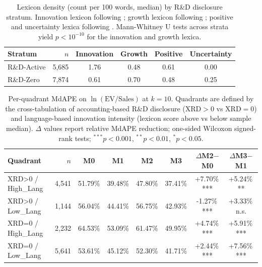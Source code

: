 \begin{table}[ht]
\centering
\caption{Lexicon density (count per 100 words, median) by R\&D disclosure stratum. Innovation lexicon following \citet{bellstam2021innovation}; growth lexicon following \citet{brown2011mda}; positive and uncertainty lexica following \citet{loughran2011liability}. Mann-Whitney U tests across strata yield $p < 10^{-10}$ for the innovation and growth lexica.}
\label{tab:phase_d1}
\small
\begin{tabular}{lr cccc}
\toprule
Stratum & $n$ & Innovation & Growth & Positive & Uncertainty \\
\midrule
  R\&D-Active   & 5,685 &  1.76 &  0.48 &  0.61 &  0.00 \\
  R\&D-Zero     & 7,874 &  0.61 &  0.70 &  0.48 &  0.25 \\
\bottomrule
\end{tabular}
\end{table}

\begin{table}[ht]
\centering
\caption{Per-quadrant MdAPE on $\ln(\textrm{EV}/\textrm{Sales})$ at $k=10$. Quadrants are defined by the cross-tabulation of accounting-based R\&D disclosure (XRD$>$0 vs XRD$=$0) and language-based innovation intensity (lexicon score above vs below sample median). $\Delta$ values report relative MdAPE reduction; one-sided Wilcoxon signed-rank tests; $^{***}p<0.001$, $^{**}p<0.01$, $^{*}p<0.05$.}
\label{tab:phase_d5}
\small
\begin{tabular}{lr cccc cc}
\toprule
Quadrant & $n$ & M0 & M1 & M2 & M3 & $\Delta$M2$-$M0 & $\Delta$M3$-$M1 \\
\midrule
  XRD>0 / High_Lang         & 4,541 & 51.79\% & 39.48\% & 47.80\% & 37.41\% & +7.70\%\,*** & +5.24\%\,** \\
  XRD>0 / Low_Lang          & 1,144 & 56.04\% & 44.41\% & 56.75\% & 42.93\% & -1.27\%\,*** & +3.33\%\,n.s. \\
  XRD=0 / High_Lang         & 2,232 & 64.53\% & 53.09\% & 61.47\% & 49.95\% & +4.74\%\,*** & +5.91\%\,*** \\
  XRD=0 / Low_Lang          & 5,641 & 53.61\% & 45.12\% & 52.30\% & 41.71\% & +2.44\%\,*** & +7.56\%\,*** \\
\bottomrule
\end{tabular}
\end{table}